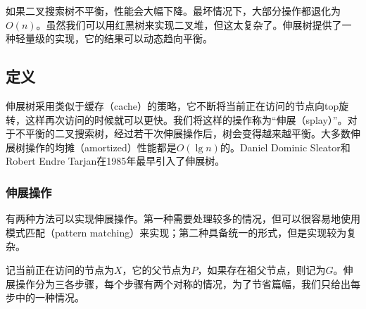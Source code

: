 \documentclass[b5paper]{ctexart}
\begin{document}
如果二叉搜索树不平衡，性能会大幅下降。最坏情况下，大部分操作都退化为$O(n)$。虽然我们可以用红黑树来实现二叉堆，但这太复杂了。伸展树提供了一种轻量级的实现，它的结果可以动态趋向平衡。


\subsection{定义}

伸展树采用类似于缓存（cache）的策略，它不断将当前正在访问的节点向top旋转，这样再次访问的时候就可以更快。我们将这样的操作称为“伸展（splay）”。对于不平衡的二叉搜索树，经过若干次伸展操作后，树会变得越来越平衡。大多数伸展树操作的均摊（amortized）性能都是$O(\lg n)$的。Daniel Dominic Sleator和Robert Endre Tarjan在1985年最早引入了伸展树\cite{wiki-splay-tree}\cite{self-adjusting-trees}。

\subsubsection{伸展操作}

有两种方法可以实现伸展操作。第一种需要处理较多的情况，但可以很容易地使用模式匹配（pattern matching）来实现；第二种具备统一的形式，但是实现较为复杂。

记当前正在访问的节点为$X$，它的父节点为$P$，如果存在祖父节点，则记为$G$。伸展操作分为三各步骤，每个步骤有两个对称的情况，为了节省篇幅，我们只给出每步中的一种情况。
\end{document}
